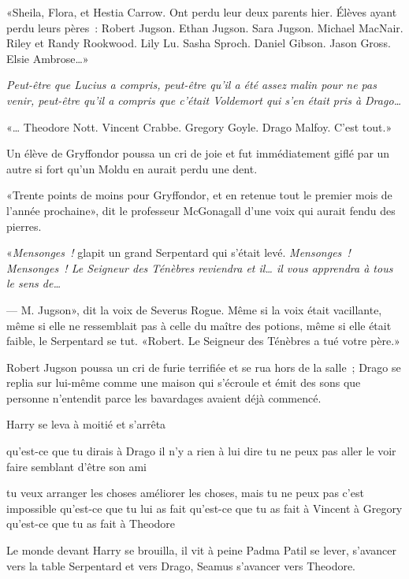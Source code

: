 «Sheila, Flora, et Hestia Carrow. Ont perdu leur deux parents hier. Élèves ayant perdu leurs pères~: Robert Jugson. Ethan Jugson. Sara Jugson. Michael MacNair. Riley et Randy Rookwood. Lily Lu. Sasha Sproch. Daniel Gibson. Jason Gross. Elsie Ambrose…»

\emph{Peut-être que Lucius a compris, peut-être qu'il a été assez malin pour ne pas venir, peut-être qu'il a compris que c'était Voldemort qui s'en était pris à Drago…}

«… Theodore Nott. Vincent Crabbe. Gregory Goyle. Drago Malfoy. C'est tout.»

Un élève de Gryffondor poussa un cri de joie et fut immédiatement giflé par un autre si fort qu'un Moldu en aurait perdu une dent.

«Trente points de moins pour Gryffondor, et en retenue tout le premier mois de l'année prochaine», dit le professeur McGonagall d'une voix qui aurait fendu des pierres.

«\emph{Mensonges~!} glapit un grand Serpentard qui s'était levé. \emph{Mensonges~! Mensonges~! Le Seigneur des Ténèbres reviendra et il… il vous apprendra à tous le sens de…}

--- M. Jugson», dit la voix de Severus Rogue. Même si la voix était vacillante, même si elle ne ressemblait pas à celle du maître des potions, même si elle était faible, le Serpentard se tut. «Robert. Le Seigneur des Ténèbres a tué votre père.»

Robert Jugson poussa un cri de furie terrifiée et se rua hors de la salle~; Drago se replia sur lui-même comme une maison qui s'écroule et émit des sons que personne n'entendit parce les bavardages avaient déjà commencé.

Harry se leva à moitié et s'arrêta

qu'est-ce que tu dirais à Drago il n'y a rien à lui dire tu ne peux pas aller le voir faire semblant d'être son ami

tu veux arranger les choses améliorer les choses, mais tu ne peux pas c'est impossible qu'est-ce que tu lui as fait qu'est-ce que tu as fait à Vincent à Gregory qu'est-ce que tu as fait à Theodore

Le monde devant Harry se brouilla, il vit à peine Padma Patil se lever, s'avancer vers la table Serpentard et vers Drago, Seamus s'avancer vers Theodore.

